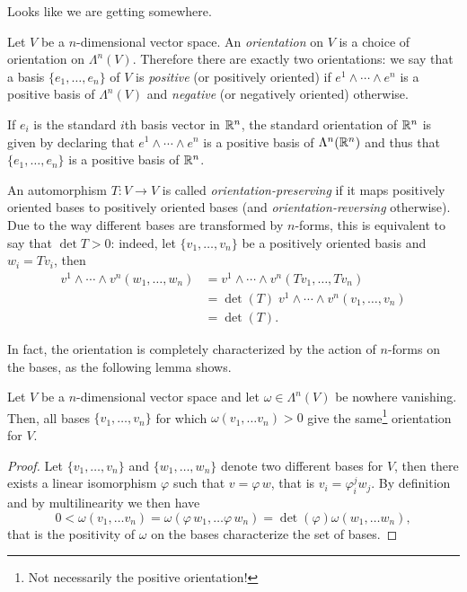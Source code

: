Looks like we are getting somewhere.

\begin{definition}
  Let $V$ be a $n$-dimensional vector space.
  An \emph{orientation} on $V$ is a choice of orientation on $\Lambda^n(V)$.
  Therefore there are exactly two orientations: we say that a basis $\{e_1,\ldots,e_n\}$ of $V$ is \emph{positive} (or positively oriented) if $e^1\wedge\cdots\wedge e^n$ is a positive basis of $\Lambda^n(V)$ and \emph{negative} (or negatively oriented) otherwise.
\end{definition}

\begin{example}
  If $e_i$ is the standard $i$th basis vector in $\mathbb{R}^n$, the standard orientation of $\mathbb{R}^n$ is given by declaring that $e^1\wedge\cdots\wedge e^n$ is a positive basis of $\Lambda^n(\mathbb{R}^n)$ and thus that $\{e_1,\ldots,e_n\}$ is a positive basis of $\mathbb{R}^n$.
\end{example}

An automorphism $T:V\to V$ is called \emph{orientation-preserving} if it maps positively oriented bases to positively oriented bases (and \emph{orientation-reversing} otherwise).
Due to the way different bases are transformed by $n$-forms,
this is equivalent to say that $\det T > 0$:
indeed, let $\{v_1, \ldots, v_n\}$ be a positively oriented basis and $w_i = T v_i$, then
\begin{align}
  v^1\wedge\cdots\wedge v^n (w_1, \ldots, w_n) &= v^1\wedge\cdots\wedge v^n (Tv_1, \ldots, Tv_n) \\
  &= \det(T)\; v^1\wedge\cdots\wedge v^n (v_1, \ldots, v_n) \\
  &= \det(T).
\end{align}

In fact, the orientation is completely characterized by the action of $n$-forms on the bases, as the following lemma shows.

\begin{lemma}\label{lemma:orient}
  Let $V$ be a $n$-dimensional vector space and let $ \omega\in\Lambda^n(V)$ be nowhere vanishing.
  Then, all bases $\{v_1, \ldots, v_n\}$ for which $\omega(v_1,\ldots v_n) > 0$ give the same\footnote{Not necessarily the positive orientation!} orientation for $V$.
\end{lemma}
\begin{proof}
  Let $\{v_1, \ldots, v_n\}$ and $\{w_1, \ldots, w_n\}$ denote two different bases for $V$, then there exists a linear isomorphism $\varphi$ such that $v = \varphi\, w$, that is $v_i = \varphi_{i}^j w_j$.
  By definition and by multilinearity we then have
  \begin{equation}\label{eq:posorie}
    0 < \omega(v_1,\ldots v_n) = \omega(\varphi\, w_1,\ldots \varphi\, w_n) = \det(\varphi)\omega(w_1,\ldots w_n),
  \end{equation} that is the positivity of $\omega$ on the bases characterize the set of bases.
\end{proof}


